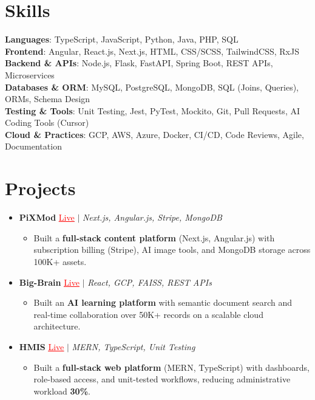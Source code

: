 \documentclass[letterpaper,10pt]{article}
\newcommand{\resumeItem}[1]{\item\small{{#1 \vspace{-2pt}}}}
\newcommand{\resumeProjectHeading}[1]{\item \small #1 \vspace{-2pt}}
\newcommand{\resumeSubHeadingListStart}{\begin{itemize}[leftmargin=0.0in, label={}]}
\newcommand{\resumeSubHeadingListEnd}{\end{itemize}}
\newcommand{\resumeProjItemListStart}{\begin{itemize}[leftmargin=0.15in,label=\textbullet,itemsep=0pt,topsep=0pt,parsep=0pt,partopsep=0pt]}
\newcommand{\resumeProjItemListEnd}{\end{itemize}\vspace{-4pt}}
\begin{document}
\section{Skills}
\begin{itemize}[leftmargin=0.15in, label={}]
\small{\item{
\textbf{Languages}: TypeScript, JavaScript, Python, Java, PHP, SQL \\
\textbf{Frontend}: Angular, React.js, Next.js, HTML, CSS/SCSS, TailwindCSS, RxJS \\
\textbf{Backend \& APIs}: Node.js, Flask, FastAPI, Spring Boot, REST APIs, Microservices \\
\textbf{Databases \& ORM}: MySQL, PostgreSQL, MongoDB, SQL (Joins, Queries), ORMs, Schema Design \\
\textbf{Testing \& Tools}: Unit Testing, Jest, PyTest, Mockito, Git, Pull Requests, AI Coding Tools (Cursor) \\
\textbf{Cloud \& Practices}: GCP, AWS, Azure, Docker, CI/CD, Code Reviews, Agile, Documentation
}}
\end{itemize}
\vspace{-6pt}
\section{Projects}
\resumeSubHeadingListStart
\vspace{-2pt}
\resumeProjectHeading{\textbf{PiXMod} {\href{https://pixmod.vercel.app/}{\textcolor{red}{\underline{Live}}}} $|$ \emph{Next.js, Angular.js, Stripe, MongoDB}}
\resumeProjItemListStart
\resumeItem{Built a \textbf{full-stack content platform} (Next.js, Angular.js) with subscription billing (Stripe), AI image tools, and MongoDB storage across 100K+ assets.}
\resumeProjItemListEnd
\vspace{3pt}
\resumeProjectHeading{\textbf{Big-Brain} {\href{https://big-brain-pied.vercel.app/}{\textcolor{red}{\underline{Live}}}} $|$ \emph{React, GCP, FAISS, REST APIs}}
\resumeProjItemListStart
\resumeItem{Built an \textbf{AI learning platform} with semantic document search and real-time collaboration over 50K+ records on a scalable cloud architecture.}
\resumeProjItemListEnd
\vspace{3pt}
\resumeProjectHeading{\textbf{HMIS} {\href{https://hims-rouge.vercel.app/}{\textcolor{red}{\underline{Live}}}} $|$ \emph{MERN, TypeScript, Unit Testing}}
\resumeProjItemListStart
\resumeItem{Built a \textbf{full-stack web platform} (MERN, TypeScript) with dashboards, role-based access, and unit-tested workflows, reducing administrative workload \textbf{30\%}.}
\resumeProjItemListEnd
\resumeSubHeadingListEnd
\end{document}
